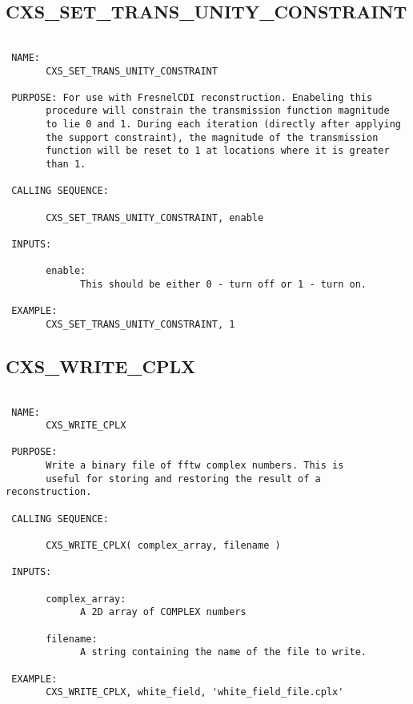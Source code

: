   
 
\subsection{CXS\_SET\_TRANS\_UNITY\_CONSTRAINT}
\begin{verbatim}

 NAME:
       CXS_SET_TRANS_UNITY_CONSTRAINT

 PURPOSE: For use with FresnelCDI reconstruction. Enabeling this
       procedure will constrain the transmission function magnitude
       to lie 0 and 1. During each iteration (directly after applying
       the support constraint), the magnitude of the transmission
       function will be reset to 1 at locations where it is greater
       than 1.

 CALLING SEQUENCE:

       CXS_SET_TRANS_UNITY_CONSTRAINT, enable

 INPUTS:

       enable:
             This should be either 0 - turn off or 1 - turn on.

 EXAMPLE:
       CXS_SET_TRANS_UNITY_CONSTRAINT, 1

\end{verbatim}

  
 
\subsection{CXS\_WRITE\_CPLX}
\begin{verbatim}

 NAME:
       CXS_WRITE_CPLX

 PURPOSE:
       Write a binary file of fftw complex numbers. This is
       useful for storing and restoring the result of a reconstruction.

 CALLING SEQUENCE:

       CXS_WRITE_CPLX( complex_array, filename )

 INPUTS:

       complex_array:
             A 2D array of COMPLEX numbers

       filename:
             A string containing the name of the file to write.

 EXAMPLE:
       CXS_WRITE_CPLX, white_field, 'white_field_file.cplx'

\end{verbatim}

  
 
